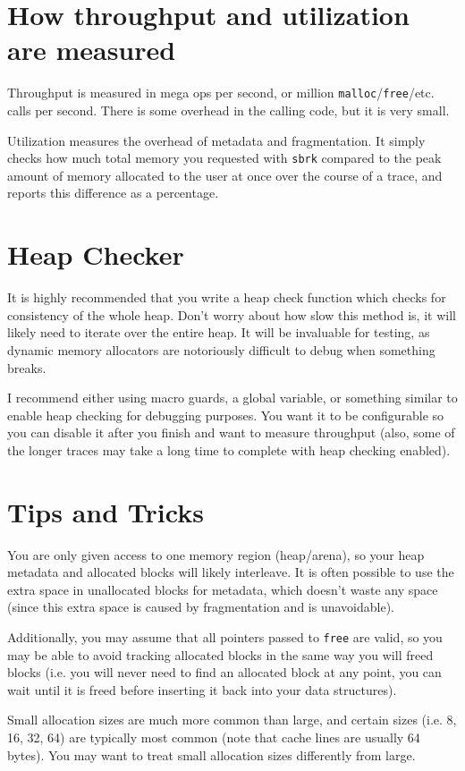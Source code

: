 \documentclass{article}
\begin{document}
\section*{How throughput and utilization are measured}

Throughput is measured in mega ops per second, or million \texttt{malloc}/\texttt{free}/etc. calls per second. There is some overhead in the calling code, but it is very small.

Utilization measures the overhead of metadata and fragmentation. It simply checks how much total memory you requested with \texttt{sbrk} compared to the peak amount of memory allocated to the user at once over the course of a trace, and reports this difference as a percentage.

\section*{Heap Checker}

It is highly recommended that you write a heap check function which checks for consistency of the whole heap. Don't worry about how slow this method is, it will likely need to iterate over the entire heap. It will be invaluable for testing, as dynamic memory allocators are notoriously difficult to debug when something breaks.

I recommend either using macro guards, a global variable, or something similar to enable heap checking for debugging purposes. You want it to be configurable so you can disable it after you finish and want to measure throughput (also, some of the longer traces may take a long time to complete with heap checking enabled).

\section*{Tips and Tricks}

You are only given access to one memory region (heap/arena), so your heap metadata and allocated blocks will likely interleave. It is often possible to use the extra space in unallocated blocks for metadata, which doesn't waste any space (since this extra space is caused by fragmentation and is unavoidable).

Additionally, you may assume that all pointers passed to \texttt{free} are valid, so you may be able to avoid tracking allocated blocks in the same way you will freed blocks (i.e. you will never need to find an allocated block at any point, you can wait until it is freed before inserting it back into your data structures).

Small allocation sizes are much more common than large, and certain sizes (i.e. 8, 16, 32, 64) are typically most common (note that cache lines are usually 64 bytes). You may want to treat small allocation sizes differently from large.
\end{document}
